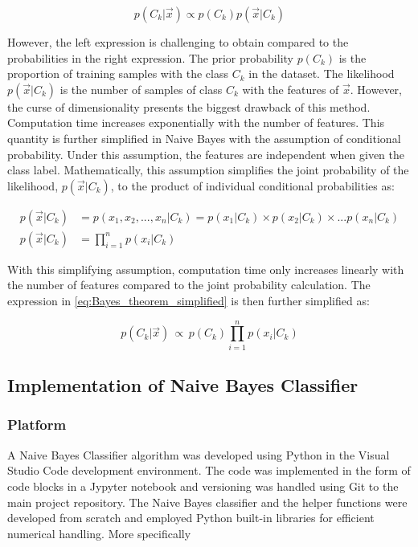 \documentclass[a4paper]{article}
\begin{document}
\begin{equation} \label{eq:Bayes_theorem_simplified}
    p(C_k|\vec{x}) \propto p(C_k)p(\vec{x}|C_k)
\end{equation}

However, the left expression is challenging to obtain compared to the probabilities in the right expression. The prior probability $p(C_k)$ is the proportion of training samples with the class $C_k$ in the dataset. The likelihood $p(\vec x|C_k)$ is the number of samples of class $C_k$ with the features of $\vec x$. However, the curse of dimensionality presents the biggest drawback of this method. Computation time increases exponentially with the number of features. This quantity is further simplified in Naive Bayes with the assumption of conditional probability. Under this assumption, the features are independent when given the class label. Mathematically, this assumption simplifies the joint probability of the likelihood, $p(\vec x|C_k)$, to the product of individual conditional probabilities as:

\begin{equation}
\begin{aligned}
    p(\vec x|C_k) &= p(x_1, x_2 , ... , x_n|C_k) = p(x_1|C_k)\times p(x_2|C_k) \times ... p(x_n|C_k) \\
    p(\vec x|C_k) &= \prod_{i=1}^n p(x_i|C_k)
\end{aligned}
\end{equation}

With this simplifying assumption, computation time only increases linearly with the number of features compared to the joint probability calculation. The expression in \cref{eq:Bayes_theorem_simplified} is then further simplified as:

\begin{equation}
     p(C_k|\vec{x}) \, \propto \, p(C_k) \prod_{i=1}^n p(x_i|C_k)
\end{equation}

\subsection{Implementation of Naive Bayes Classifier}

\subsubsection{Platform} \label{subsubsec:platform}

A Naive Bayes Classifier algorithm was developed using Python in the Visual Studio Code development environment. The code was implemented in the form of code blocks in a Jypyter notebook and versioning was handled using Git to the main project repository. The Naive Bayes classifier and the helper functions were developed from scratch and employed Python built-in libraries for efficient numerical handling. More specifically
\end{document}
